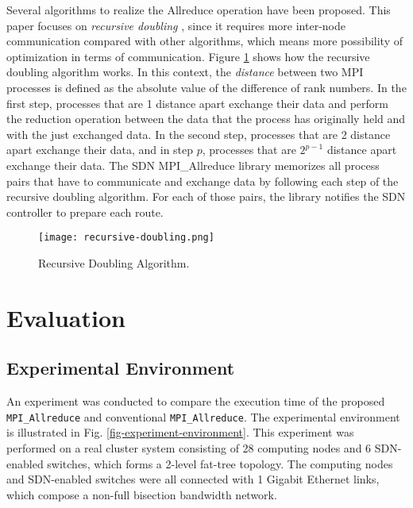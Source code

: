 Several algorithms to realize the Allreduce operation have been
proposed. This paper focuses on \emph{recursive doubling}
\cite{Thakur2005}, since it requires more inter-node communication
compared with other algorithms, which means more possibility of
optimization in terms of communication. Figure
\ref{fig-recursive-doubling} shows how the recursive doubling algorithm
works. In this context, the \emph{distance} between two MPI processes is
defined as the absolute value of the difference of rank numbers. In the
first step, processes that are 1 distance apart exchange their data and
perform the reduction operation between the data that the process has
originally held and with the just exchanged data. In the second step,
processes that are 2 distance apart exchange their data, and in step
\(p\), processes that are \(2^{p - 1}\) distance apart exchange their
data. The SDN MPI\_Allreduce library memorizes all process pairs that
have to communicate and exchange data by following each step of the
recursive doubling algorithm. For each of those pairs, the library
notifies the SDN controller to prepare each route.

\begin{figure}[htbp]
    \begin{center}
        \texttt{[image: recursive-doubling.png]}
    \end{center}
    \caption{Recursive Doubling Algorithm.}
    \label{fig-recursive-doubling}
\end{figure}

\hypertarget{evaluation}{%
\section{Evaluation}\label{evaluation}}

\hypertarget{experimental-environment}{%
\subsection{Experimental Environment}\label{experimental-environment}}

An experiment was conducted to compare the execution time of the
proposed \texttt{MPI\_Allreduce} and conventional
\texttt{MPI\_Allreduce}. The experimental environment is illustrated in
Fig. \ref{fig-experiment-environment}. This experiment was performed on
a real cluster system consisting of 28 computing nodes and 6 SDN-enabled
switches, which forms a 2-level fat-tree topology. The computing nodes
and SDN-enabled switches were all connected with 1 Gigabit Ethernet
links, which compose a non-full bisection bandwidth network.

